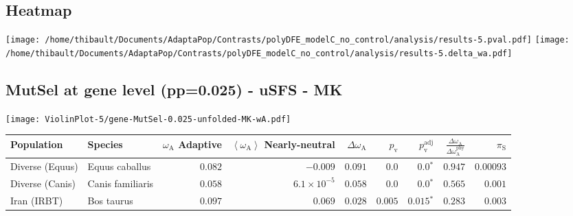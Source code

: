 \subsection{Heatmap} 
\begin{center}
\texttt{[image: /home/thibault/Documents/AdaptaPop/Contrasts/polyDFE\_modelC\_no\_control/analysis/results-5.pval.pdf]} 
\texttt{[image: /home/thibault/Documents/AdaptaPop/Contrasts/polyDFE\_modelC\_no\_control/analysis/results-5.delta\_wa.pdf]} 
\end{center}
\subsection{MutSel at gene level (pp=0.025) - uSFS - MK} 
\begin{center}
\texttt{[image: ViolinPlot-5/gene-MutSel-0.025-unfolded-MK-wA.pdf]} 
\begin{adjustbox}{width = 1\textwidth}
\begin{tabular}{|l|l|r|r|r|r|r|r|r|}
\toprule
                     Population &              Species & \specialcell{$\omega_{\mathrm{A}}$ \\ Adaptive} & \specialcell{$\left< \omega_{\mathrm{A}} \right>$ \\ Nearly-neutral} & $\Delta \omega_{\mathrm{A}} $ & $p_{\mathrm{v}}$ & $p_{\mathrm{v}}^{\mathrm{adj}}$ & $\frac{\Delta\omega_{\mathrm{A}}}{\Delta\omega_{\mathrm{A}}^{\mathrm{phy}}}$ & $\pi_{\textrm{S}}$ \\
\midrule
                Diverse (Equus) &       Equus caballus &                                        $ 0.082$ &                                           $-0.009$ &                      $ 0.091$ &            $0.0$ &                  $\bm{0.0{^*}}$ &                                           $ 0.947$ &          $0.00093$ \\
                Diverse (Canis) &     Canis familiaris &                                        $ 0.058$ &                                $6.1\times 10^{-5}$ &                      $ 0.058$ &            $0.0$ &                  $\bm{0.0{^*}}$ &                                           $ 0.565$ &           $ 0.001$ \\
                    Iran (IRBT) &           Bos taurus &                                        $ 0.097$ &                                           $ 0.069$ &                      $ 0.028$ &         $ 0.005$ &               $\bm{ 0.015{^*}}$ &                                           $ 0.283$ &           $ 0.003$ \\

\end{tabular}
\end{adjustbox}
\end{center}

